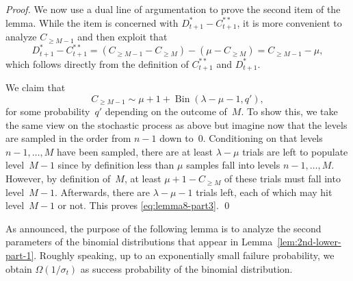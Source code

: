 \documentclass[11pt, a4paper]{article}
\DeclareMathOperator{\Bin}{Bin}
\begin{document}
\begin{proof}
		
		
		
		
		
		We now use a dual line of argumentation to  prove the second item 
		of the lemma. While the item is concerned with $D^*_{t+1}-C^{**}_{t+1}$, it 
		is more convenient to analyze $C_{\ge M-1}$ and then exploit that 
		\begin{equation}
		D^*_{t+1}-C^{**}_{t+1} = (C_{\ge M-1}-C_{\ge M}) - (\mu-C_{\ge M}) = C_{\ge M-1}-\mu,
		\label{eq:lemma8-help}
		\end{equation}
		which follows directly from the definition of $C^{**}_{t+1}$ and $D^*_{t+1}$.
		
		We claim that 
		\begin{equation}
		C_{\ge M-1} \sim \mu + 1 + \Bin(\lambda-\mu-1,q'),
		\label{eq:lemma8-part3}
		\end{equation}
		for some probability~$q'$ depending on the outcome of~$M$.
		To show this, 
		we take the same view on the stochastic process as above but imagine 
		now that the levels are sampled in the order from $n-1$ down to~$0$. Conditioning 
		on that levels $n-1,\dots,M$ have been sampled, 
		there are at least $\lambda-\mu$ trials are left 
		to populate level~$M-1$ 
		 since  by definition less than $\mu$ samples 
		fall into levels $n-1,\dots,M$. However, by definition of~$M$, at least 
		$\mu+1-C_{\ge M}$ of these trials must fall into level~$M-1$. Afterwards, there are 
		$\lambda-\mu-1$ trials left, each of which may hit level~$M-1$ or not. This proves
		\eqref{eq:lemma8-part3}.
\qed\end{proof}

As announced, the purpose of the following lemma is to analyze the second parameters 
of the binomial distributions that appear in Lemma~\ref{lem:2nd-lower-part-1}. Roughly speaking, 
up to an exponentially small failure probability, we obtain $\Omega(1/\sigma_t)$ as success probability of 
the binomial distribution.
\end{document}
